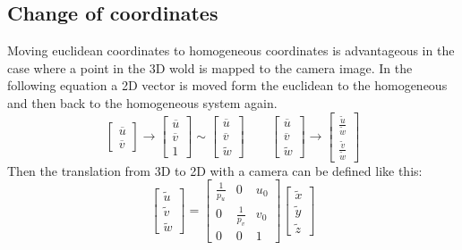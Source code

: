 \subsection{Change of coordinates}%
\label{sub:motod:changeofocd}
Moving euclidean coordinates to homogeneous coordinates is advantageous in the case where a point in the 3D wold is mapped to the camera image.
In the following equation a 2D vector is moved form the euclidean to the homogeneous and then back to the homogeneous system again.
\begin{equation}
    \begin{bmatrix}
        \overline{u}\\ \overline{v}
    \end{bmatrix}
    \rightarrow
    \begin{bmatrix}
        \overline{u}\\ \overline{v} \\ 1
    \end{bmatrix} \sim
    \begin{bmatrix}
        \overline{u}\\ \overline{v} \\ \tilde w
    \end{bmatrix}\qquad
    \begin{bmatrix}
        \overline{u}\\ \overline{v} \\ \tilde w
    \end{bmatrix}
    \rightarrow
    \begin{bmatrix}
        \frac{\tilde u}{\tilde w}\\
        \frac{\tilde v}{\tilde w}
    \end{bmatrix}
\end{equation}
Then the translation from 3D to 2D with a camera can be defined like this:
\begin{equation}
    \begin{bmatrix}
        \tilde u \\ \tilde v \\ \tilde w
    \end{bmatrix}
    =
    \begin{bmatrix}
        \frac{1}{p_u} & 0 & u_0\\
        0 & \frac{1}{p_v} & v_0\\
        0 & 0 & 1
    \end{bmatrix}
    \begin{bmatrix}
        \tilde x\\ \tilde y\\ \tilde z
    \end{bmatrix}
\end{equation}

